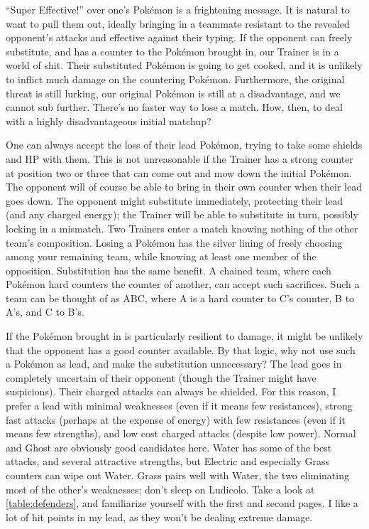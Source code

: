 ``Super Effective!'' over one's Pokémon is a frightening message.
It is natural to want to pull them out, ideally bringing in a teammate resistant
  to the revealed opponent's attacks and effective against their typing.
If the opponent can freely substitute, and has a counter to the Pokémon brought in,
  our Trainer is in a world of shit.
Their substituted Pokémon is going to get cooked, and it is unlikely to inflict much damage on the countering Pokémon.
Furthermore, the original threat is still lurking, our original Pokémon is still at a disadvantage,
 and we cannot sub further.
There's no faster way to lose a match.
How, then, to deal with a highly disadvantageous initial matchup?

One can always accept the loss of their lead Pokémon, trying to take some shields and HP with them.
This is not unreasonable if the Trainer has a strong counter at position two or three
  that can come out and mow down the initial Pokémon.
The opponent will of course be able to bring in their own counter when their lead goes down.
The opponent might substitute immediately, protecting their lead (and any charged energy); the Trainer will be able to substitute in turn, possibly locking in a mismatch.
Two Trainers enter a match knowing nothing of the other team's composition.
Losing a Pokémon has the silver lining of freely choosing among your remaining team,
  while knowing at least one member of the opposition.
Substitution has the same benefit.
A chained team, where each Pokémon hard counters the counter of another, can accept such sacrifices.
Such a team can be thought of as ABC, where A is a hard counter to C's counter, B to A's, and C to B's.

If the Pokémon brought in is particularly resilient to damage, it might be unlikely that
 the opponent has a good counter available.
By that logic, why not use such a Pokémon as lead, and make the substitution unnecessary?
The lead goes in completely uncertain of their opponent (though the Trainer might have suspicions).
Their charged attacks can always be shielded.
For this reason, I prefer a lead with minimal weaknesses (even if it means few resistances),
 strong fast attacks (perhaps at the expense of energy) with few resistances (even if it means
 few strengths), and low cost charged attacks (despite low power). 
Normal and Ghost are obviously good candidates here.
Water has some of the best attacks, and several attractive strengths, but Electric and
 especially Grass counters can wipe out Water.
Grass pairs well with Water, the two eliminating most of the other's weaknesses;
 don't sleep on Ludicolo.
Take a look at \autoref{table:defenders}, and familiarize yourself with the first
 and second pages.
I like a lot of hit points in my lead, as they won't be dealing extreme damage.

